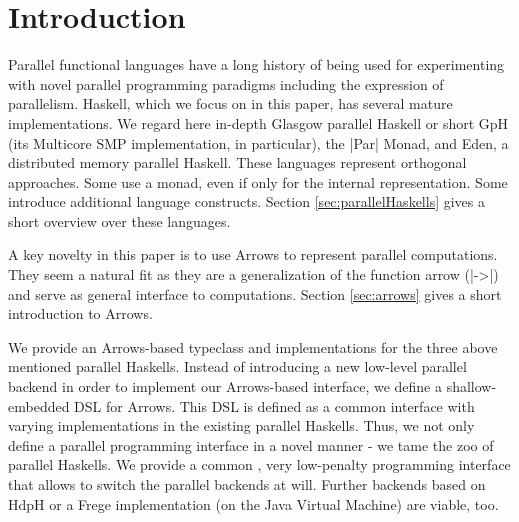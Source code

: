 
\section{Introduction}
\label{sec:introduction}
%
%
%

Parallel functional languages have a long history of being used for experimenting with novel parallel programming paradigms including the expression of parallelism. Haskell, which we focus on in this paper, has  several mature implementations. We regard here in-depth
Glasgow parallel Haskell or short GpH (its Multicore SMP implementation, in particular), the
|Par| Monad, and Eden, a distributed memory parallel Haskell. These
languages represent orthogonal approaches. Some use a monad, even if
only for the internal representation. Some introduce additional
language constructs. Section \ref{sec:parallelHaskells} gives a short overview over these languages.

A key novelty in this paper is to use Arrows to represent parallel computations. They seem a natural fit as they are a generalization of the function arrow (|->|) and serve as general interface to computations. Section \ref{sec:arrows} gives a short introduction to Arrows.

We provide an Arrows-based typeclass and implementations for the three above mentioned parallel Haskells.
Instead of 
introducing a new low-level parallel backend in order to implement our
Arrows-based interface, we define a shallow-embedded DSL for Arrows. This DSL
is defined as a common interface with varying implementations in
the existing parallel Haskells. Thus, we not only define a parallel programming interface in a
novel manner - we tame the zoo of parallel Haskells. We provide a
common , very low-penalty programming interface that allows to switch
the parallel backends at will. Further backends based on HdpH or a Frege implementation (on the Java Virtual Machine) are viable, too.

